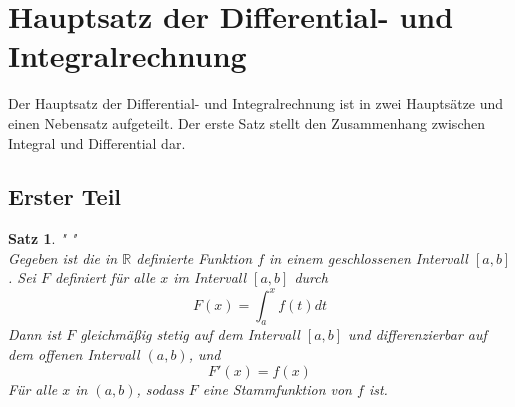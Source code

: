 \documentclass[fontsize=12pt,paper=a4,DIV12,cleardoublepage=empty, 
liststotoc,idxtotoc,bibtotoc]{article}
\newcommand{\RR}{\mathbb{R}}
\theoremstyle{plain}
\newtheorem{satz}{Satz}[subsection]
\theoremstyle{definition}
\begin{document}
	
	\section{Hauptsatz der Differential- und Integralrechnung}
	
	Der Hauptsatz der Differential- und Integralrechnung ist in zwei Hauptsätze und einen Nebensatz aufgeteilt. Der erste Satz stellt den Zusammenhang zwischen Integral und Differential dar.

	\subsection{Erster Teil}
	\begin{satz}" "\\
		Gegeben ist die in $\RR$ definierte Funktion $f$ in einem geschlossenen Intervall $[a, b]$. Sei $F$ definiert für alle $x$ im Intervall $[a, b]$ durch \\
			\begin{equation*}
				F(x)=\int_{a}^{x}f(t) dt
			\end{equation*}
		Dann ist $F$ gleichmäßig stetig auf dem Intervall $[a, b]$ und differenzierbar auf dem offenen Intervall $(a, b)$, und 
			\begin{equation*}
				F'(x)=f(x)
			\end{equation*}
		Für alle $x$ in $(a, b)$, sodass $F$ eine Stammfunktion von $f$ ist.\\\\
	
	\end{satz}
	
\end{document}
